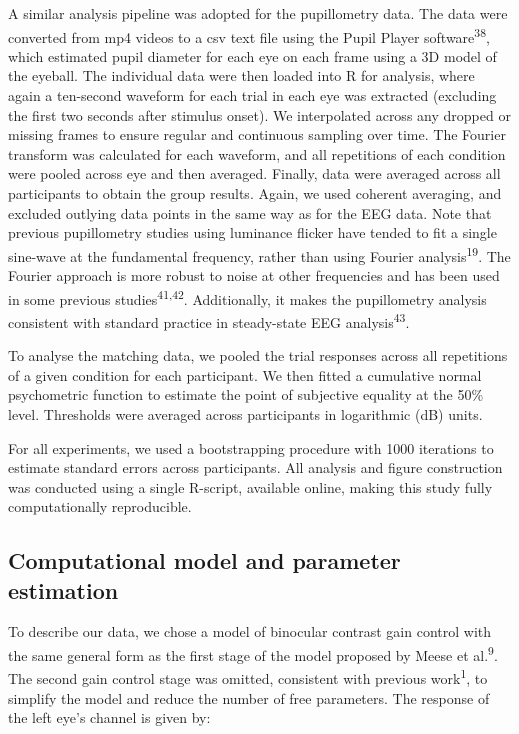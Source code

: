 \documentclass[
]{article}
\begin{document}
A similar analysis pipeline was adopted for the pupillometry data. The data were converted from mp4 videos to a csv text file using the Pupil Player software\textsuperscript{38}, which estimated pupil diameter for each eye on each frame using a 3D model of the eyeball. The individual data were then loaded into R for analysis, where again a ten-second waveform for each trial in each eye was extracted (excluding the first two seconds after stimulus onset). We interpolated across any dropped or missing frames to ensure regular and continuous sampling over time. The Fourier transform was calculated for each waveform, and all repetitions of each condition were pooled across eye and then averaged. Finally, data were averaged across all participants to obtain the group results. Again, we used coherent averaging, and excluded outlying data points in the same way as for the EEG data. Note that previous pupillometry studies using luminance flicker have tended to fit a single sine-wave at the fundamental frequency, rather than using Fourier analysis\textsuperscript{19}. The Fourier approach is more robust to noise at other frequencies and has been used in some previous studies\textsuperscript{41,42}. Additionally, it makes the pupillometry analysis consistent with standard practice in steady-state EEG analysis\textsuperscript{43}.

To analyse the matching data, we pooled the trial responses across all repetitions of a given condition for each participant. We then fitted a cumulative normal psychometric function to estimate the point of subjective equality at the 50\% level. Thresholds were averaged across participants in logarithmic (dB) units.

For all experiments, we used a bootstrapping procedure with 1000 iterations to estimate standard errors across participants. All analysis and figure construction was conducted using a single R-script, available online, making this study fully computationally reproducible.

\hypertarget{computational-model-and-parameter-estimation}{%
\subsection{Computational model and parameter estimation}\label{computational-model-and-parameter-estimation}}

To describe our data, we chose a model of binocular contrast gain control with the same general form as the first stage of the model proposed by Meese et al.\textsuperscript{9}. The second gain control stage was omitted, consistent with previous work\textsuperscript{1}, to simplify the model and reduce the number of free parameters. The response of the left eye's channel is given by:
\end{document}
